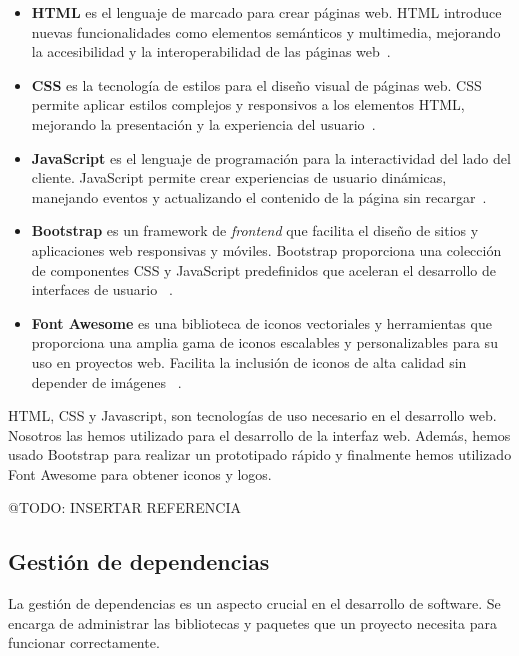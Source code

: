 \begin{itemize}
    \item \textbf{HTML} es el lenguaje de marcado para crear páginas web.
    HTML introduce nuevas funcionalidades como elementos semánticos y multimedia, mejorando la accesibilidad y la
    interoperabilidad de las páginas web~\cite{https://www.w3.org/TR/html5/}.
    \item \textbf{CSS} es la tecnología de estilos para el diseño visual de páginas web.
    CSS permite aplicar estilos complejos y responsivos a los elementos HTML, mejorando la presentación y la
    experiencia del usuario~\cite{https://www.w3.org/Style/CSS/}.
    \item \textbf{JavaScript} es el lenguaje de programación para la interactividad del lado del cliente.
    JavaScript permite crear experiencias de usuario dinámicas, manejando eventos y actualizando el contenido de la
    página sin recargar~\cite{https://www.ecma-international.org/publications-and-standards/standards/ecma-262/}.
    \item \textbf{Bootstrap} es un framework de \textit{frontend} que facilita el diseño de sitios y aplicaciones web
    responsivas y móviles.
    Bootstrap proporciona una colección de componentes CSS y JavaScript predefinidos que aceleran el desarrollo de
    interfaces de usuario ~\cite{https://getbootstrap.com/}.
    \item \textbf{Font Awesome} es una biblioteca de iconos vectoriales y herramientas que proporciona una amplia
    gama de iconos escalables y personalizables para su uso en proyectos web.
    Facilita la inclusión de iconos de alta calidad sin depender de imágenes ~\cite{https://fontawesome.com/}.
\end{itemize}

HTML, CSS y Javascript, son tecnologías de uso necesario en el desarrollo web.
Nosotros las hemos utilizado para el desarrollo de la interfaz web.
Además, hemos usado Bootstrap para realizar un prototipado rápido y finalmente hemos utilizado Font Awesome para obtener
iconos y logos.

\colorbox{color_highlight}{@TODO: INSERTAR REFERENCIA}

\subsection*{Gestión de dependencias}

La gestión de dependencias es un aspecto crucial en el desarrollo de software.
Se encarga de administrar las bibliotecas y paquetes que un proyecto necesita para funcionar correctamente.

